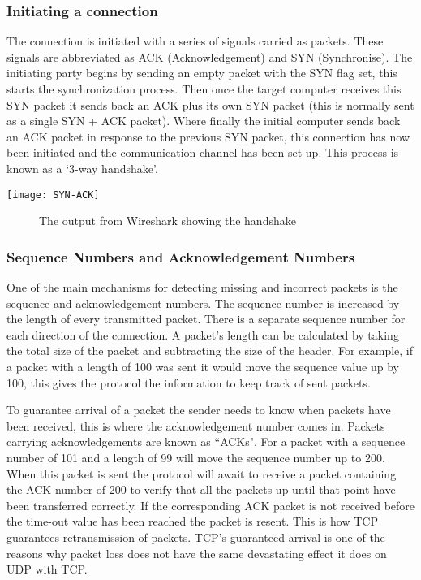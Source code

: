 \subsubsection*{Initiating a connection}
The connection is initiated with a series of signals carried as packets. These signals are abbreviated as ACK (Acknowledgement) and SYN (Synchronise). The initiating party begins by sending an empty packet with the SYN flag set, this starts the synchronization process. Then once the target computer receives this SYN packet it sends back an ACK plus its own SYN packet (this is normally sent as a single SYN + ACK packet). Where finally the initial computer sends back an ACK packet in response to the previous SYN packet, this connection has now been initiated and the communication channel has been set up. This process is known as a `3-way handshake'.

\begin{center}
	\texttt{[image: SYN-ACK]}
	\begin{figure}[h]
		\caption{The output from Wireshark showing the handshake}
	\end{figure}
\end{center}

\clearpage
\subsubsection*{Sequence Numbers and Acknowledgement Numbers}
One of the main mechanisms for detecting missing and incorrect packets is the sequence and acknowledgement numbers. The sequence number is increased by the length of every transmitted packet. There is a separate sequence number for each direction of the connection. A packet's length can be calculated by taking the total size of the packet and subtracting the size of the header. For example, if a packet with a length of 100 was sent it would move the sequence value up by 100, this gives the protocol the information to keep track of sent packets.

To guarantee arrival of a packet the sender needs to know when packets have been received, this is where the acknowledgement number comes in. Packets carrying acknowledgements are known as ``ACKs". For a packet with a sequence number of 101 and a length of 99 will move the sequence number up to 200. When this packet is sent the protocol will await to receive a packet containing the ACK number of 200 to verify that all the packets up until that point have been transferred correctly. If the corresponding ACK packet is not received before the time-out value has been reached the packet is resent. This is how TCP guarantees retransmission of packets. TCP's guaranteed arrival is one of the reasons why packet loss does not have the same devastating effect it does on UDP with TCP.

